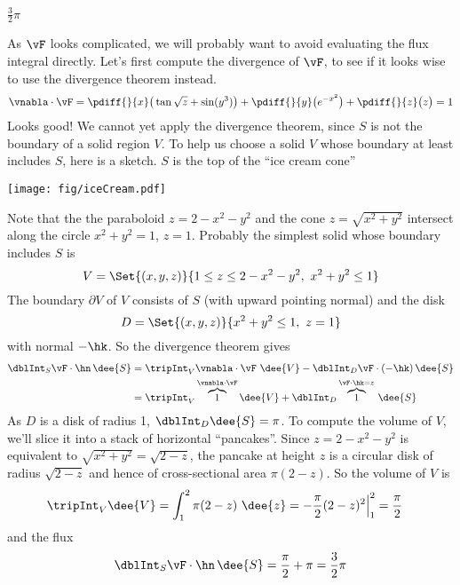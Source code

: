 \begin{answer} 
$\frac{3}{2}\pi$
\end{answer}

\begin{solution} 
As $\vF$ looks complicated, we will probably want to avoid evaluating
the flux integral directly. Let's first compute the divergence of $\vF$,
to see if it looks wise to use the divergence theorem instead.
\begin{align*}
\vnabla\cdot\vF = 
   \pdiff{}{x}\big(\tan \sqrt{z} + \sin(y^3)\big)
   +\pdiff{}{y}\big(e^{-x^2}\big)
   +\pdiff{}{z}\big(z\big)
=1
\end{align*}
Looks good! We cannot yet apply the divergence theorem, since $S$ is
not the boundary of a solid region $V$. To help us choose a solid 
$V$ whose boundary at least includes $S$, here is a sketch. $S$ is the
top of the ``ice cream cone''

\begin{center}
       \texttt{[image: fig/iceCream.pdf]}
\end{center}
Note that the the paraboloid $z = 2 - x^2 - y^2$ and the cone
$z = \sqrt{x^2+y^2}$ intersect along the circle $x^2+y^2=1$, $z=1$.
Probably the simplest solid whose boundary includes $S$ is
\begin{equation*}
V=\Set{(x,y,z)}{1\le z\le 2-x^2-y^2,\ x^2+y^2\le 1}
\end{equation*}
The boundary $\partial V$ of $V$ consists of $S$ (with upward pointing normal)
and the disk
\begin{equation*}
D = \Set{(x,y,z)}{x^2+y^2\le 1,\ z=1}
\end{equation*}
with normal $-\hk$. So the divergence theorem gives
\begin{align*}
\dblInt_S \vF \cdot\hn\,\dee{S}
&=\tripInt_V \vnabla\cdot\vF\ \dee{V} 
      -\dblInt_D \vF \cdot(-\hk)\,\dee{S} \\
&=\tripInt_V  \overbrace{1}^{\vnabla\cdot\vF}\dee{V} 
      +\dblInt_D \overbrace{1}^{\vF \cdot \hk = z}\,\dee{S} 
\end{align*}
As $D$ is a disk of radius 1, $\dblInt_D \dee{S}=\pi$. To compute the volume of
$V$, we'll slice it into a stack of horizontal ``pancakes''. Since
$z=2-x^2-y^2$ is equivalent to $\sqrt{x^2+y^2}=\sqrt{2-z}$, the pancake at height $z$
is a circular disk of radius $\sqrt{2-z}$ and hence of cross-sectional area
$\pi(2-z)$. So the volume of $V$ is
\begin{align*}
\tripInt_V  \dee{V}
&=\int_1^2 \pi(2-z) \ \dee{z}
= -\frac{\pi}{2}(2-z)^2\Big|_1^2
=\frac{\pi}{2}
\end{align*}
and the flux
\begin{align*}
\dblInt_S \vF \cdot\hn\,\dee{S}
=\frac{\pi}{2} +\pi =\frac{3}{2}\pi
\end{align*}

\end{solution}

